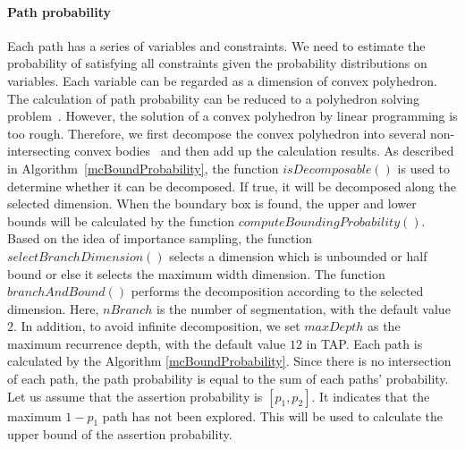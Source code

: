 \documentclass[sigconf,review, anonymous]{acmart}
\begin{document}
\paragraph{Path probability} Each path has a series of variables and constraints. We need to estimate the probability of satisfying all constraints given the probability distributions on variables. Each variable can be regarded as a dimension of convex polyhedron. The calculation of path probability can be reduced to a polyhedron solving problem~\cite{Visser2012Green}. However, the solution of a convex polyhedron by linear programming is too rough. Therefore, we first decompose the convex polyhedron into several non-intersecting convex bodies~\cite{Bingsheng2020} and then add up the calculation results. As described in Algorithm~\ref{mcBoundProbability}, the function $isDecomposable()$  is used to determine whether it can be decomposed. If true, it will be decomposed along the selected dimension. When the boundary box is found, the upper and lower bounds will be calculated by the function $computeBoundingProbability()$. Based on the idea of importance sampling, the function $selectBranchDimension()$ selects a dimension which is unbounded or half bound or else it selects the maximum width dimension. The function $branchAndBound()$ performs the decomposition according to the selected dimension. Here, $nBranch$ is the number of segmentation, with the default value $2$. In addition, to avoid infinite decomposition, we set $maxDepth$ as the maximum recurrence depth, with the default value $12$ in TAP. Each path is calculated by the Algorithm \ref{mcBoundProbability}. Since there is no intersection of each path, the path probability is equal to the sum of each paths' probability. Let us assume that the assertion probability is $[p_1,p_2]$. It indicates that the maximum $1-p_1$ path has not been explored. This will be used to calculate the upper bound of the assertion probability.
\end{document}
